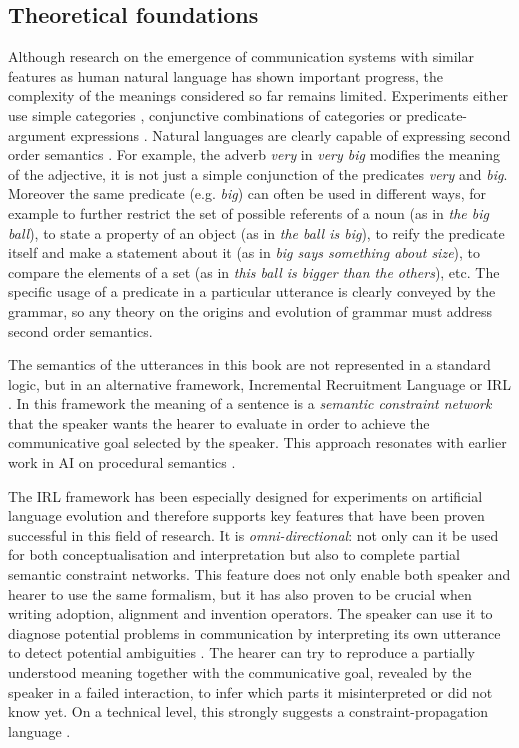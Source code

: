 \subsection{Theoretical foundations}

Although research on the emergence of communication systems with
similar features as human natural language has shown important
progress, the complexity of the meanings considered so far remains
limited. Experiments either use simple categories
\citep{steels05coordinating, belpaeme05explaining}, conjunctive
combinations of categories \citep{wellens08flexible} or
predicate-argument expressions \citep{batali02negotiation,
  smith03iterated, debeule08emergence}. Natural languages are clearly
capable of expressing second order semantics
\citep{dowty1981introduction}. For example, the adverb \textit{very} in
\textit{very big} modifies the meaning of the adjective, it is not just a
simple conjunction of the predicates \textit{very} and \textit{big}. Moreover the
same predicate (e.g. \textit{big}) can often be used in different ways, for
example to further restrict the set of possible referents of a noun
(as in \textit{the big ball}), to state a property of an object (as in
\textit{the ball is big}), to reify the predicate itself and make a
statement about it (as in \textit{big says something about size}), to
compare the elements of a set (as in \textit{this ball is bigger than the
others}), etc. The specific usage of a predicate in a particular
utterance is clearly conveyed by the grammar, so any theory on the
origins and evolution of grammar must address second order semantics.

The semantics of the utterances in this book are not represented in
a standard logic, but in an alternative framework, Incremental
Recruitment Language or IRL \citep{steels00emergence,
  steels05planning, vandenbroeck07constraintbased,
  vandenbroeck08constraintbased}. In this framework the meaning of a
sentence is a \emph{semantic constraint network} that the speaker
wants the hearer to evaluate in order to achieve the communicative
goal selected by the speaker. This approach resonates with earlier
work in AI on procedural semantics \citep{winograd72understanding}.

The IRL framework has been especially designed for experiments on
artificial language evolution and therefore supports key features that
have been proven successful in this field of research. It is
\emph{omni-directional}: not only can it be used for both
conceptualisation and interpretation but also to complete partial
semantic constraint networks. This feature does not only enable both
speaker and hearer to use the same formalism, but it has also proven
to be crucial when writing adoption, alignment and invention
operators. The speaker can use it to diagnose potential problems in
communication by interpreting its own utterance to detect potential
ambiguities \citep{steels03reentrance}. The hearer can try to
reproduce a partially understood meaning together with the
communicative goal, revealed by the speaker in a failed interaction,
to infer which parts it misinterpreted or did not know yet. On a
technical level, this strongly suggests a constraint-propagation
language \citep{marriott98programming}.

